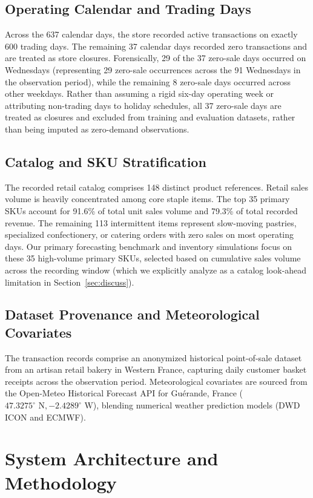 \documentclass[conference]{IEEEtran}
\begin{document}
\subsection{Operating Calendar and Trading Days}
Across the 637 calendar days, the store recorded active transactions on exactly 600 trading days. The remaining 37 calendar days recorded zero transactions and are treated as store closures. Forensically, 29 of the 37 zero-sale days occurred on Wednesdays (representing 29 zero-sale occurrences across the 91 Wednesdays in the observation period), while the remaining 8 zero-sale days occurred across other weekdays. Rather than assuming a rigid six-day operating week or attributing non-trading days to holiday schedules, all 37 zero-sale days are treated as closures and excluded from training and evaluation datasets, rather than being imputed as zero-demand observations.

\subsection{Catalog and SKU Stratification}
The recorded retail catalog comprises 148 distinct product references. Retail sales volume is heavily concentrated among core staple items. The top 35 primary SKUs account for 91.6\% of total unit sales volume and 79.3\% of total recorded revenue. The remaining 113 intermittent items represent slow-moving pastries, specialized confectionery, or catering orders with zero sales on most operating days. Our primary forecasting benchmark and inventory simulations focus on these 35 high-volume primary SKUs, selected based on cumulative sales volume across the recording window (which we explicitly analyze as a catalog look-ahead limitation in Section~\ref{sec:discuss}).

\subsection{Dataset Provenance and Meteorological Covariates}
The transaction records comprise an anonymized historical point-of-sale dataset from an artisan retail bakery in Western France, capturing daily customer basket receipts across the observation period. Meteorological covariates are sourced from the Open-Meteo Historical Forecast API for Guérande, France ($47.3275^\circ\text{ N}, -2.4289^\circ\text{ W}$), blending numerical weather prediction models (DWD ICON and ECMWF).

\section{System Architecture and Methodology}
\label{sec:method}
\end{document}

